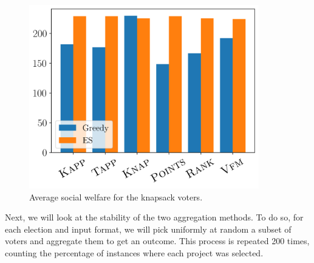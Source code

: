\documentclass[10pt]{article}
\newcommand{\kibitz}[2]{\ifnum\Comments=1{\color{#1}{#2}}\fi}
\newcommand{\rf}[1]{\kibitz{blue}{[Roy says:#1]}}
\begin{document}
\begin{figure}[!htbp]
\begin{center}
\includegraphics[width=10cm]{experiment/Knapsack_welfare.png}

\caption{Average social welfare for the knapsack voters.
}\label{fig:welfare}
\end{center}
\end{figure}




Next, we will look at the stability of the two aggregation methods. To do so, for each election and input format, we will pick uniformly at random a subset of voters and aggregate them to get an outcome. This process is repeated 200 times, counting the percentage of instances where each project was selected. \rf{I want to add here also numeric evaluation to stability to support the claim in addition to the visual results}
\end{document}
